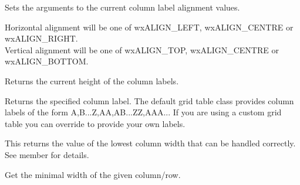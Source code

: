 \label{wxgridgetcollabelalignment}


Sets the arguments to the current column label alignment values.

Horizontal alignment will be one of wxALIGN\_LEFT, wxALIGN\_CENTRE or wxALIGN\_RIGHT.\\
Vertical alignment will be one of wxALIGN\_TOP, wxALIGN\_CENTRE or wxALIGN\_BOTTOM.




\label{wxgridgetcollabelsize}


Returns the current height of the column labels.



\label{wxgridgetcollabelvalue}


Returns the specified column label. The default grid table class provides column labels of
the form A,B...Z,AA,AB...ZZ,AAA... If you are using a custom grid table you can override
 to provide
your own labels.



\label{wxgridgetcolminimalacceptablewidth}


This returns the value of the lowest column width that can be handled correctly. See
member  for details.



\label{wxgridgetcolminimalwidth}


Get the minimal width of the given column/row.



\label{wxgridgetcolright}




